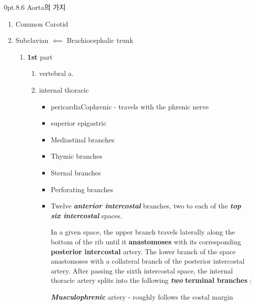 \documentclass[10pt]{amsart}
\makeatletter
\numberwithin{theorem}{section}
\numberwithin{example}{section}
\theoremstyle{definition}
\theoremstyle{remark}
\renewcommand\section{\@startsection{section}{1}%
{0pt}{.8\linespacing\@plus\linespacing}{.6\linespacing}%
{\LARGE\bfseries\color{black}}}
\makeatother
\begin{document}
\section{Aorta의 가지 }

\vspace{2pt}

\begin{enumerate}

\item  Common Carotid 

\vspace{3pt}

\item Subclavian $\impliedby$ Brachiocephalic trunk 


\begin{enumerate}
    \item \textbf{1st} part 
    
    \begin{enumerate}
        \item vertebral a. 
        \item  internal thoracic
        \begin{itemize}
            \item pericardiaCophrenic  - travels with the phrenic nerve
            
            \item  superior epigastric 
            
            \item    Mediastinal branches
    \item Thymic branches
    \item  Sternal branches
\item Perforating branches

\item  
Twelve \textit{\textbf{anterior intercostal}} branches, two to each of the \textit{\textbf{top six intercostal}}  spaces.


 In a given space, the upper branch travels laterally along the bottom of the rib until it \textbf{anastomoses} with its corresponding \textbf{posterior intercostal} artery. The lower branch of the space anastomoses with a collateral branch of the posterior intercostal artery.
After passing the sixth intercostal space, the internal thoracic artery splits into the following \textit{\textbf{two}} \textbf{terminal branches} :

\textit{\textbf{Musculophrenic}}  artery - roughly follows the costal margin



\end{itemize}
\end{enumerate}
\end{enumerate}
\end{enumerate}
\end{document}
